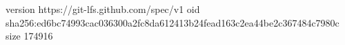 version https://git-lfs.github.com/spec/v1
oid sha256:ed6bc74993cac036300a2fc8da612413b24fead163c2ea44be2c367484c7980c
size 174916
